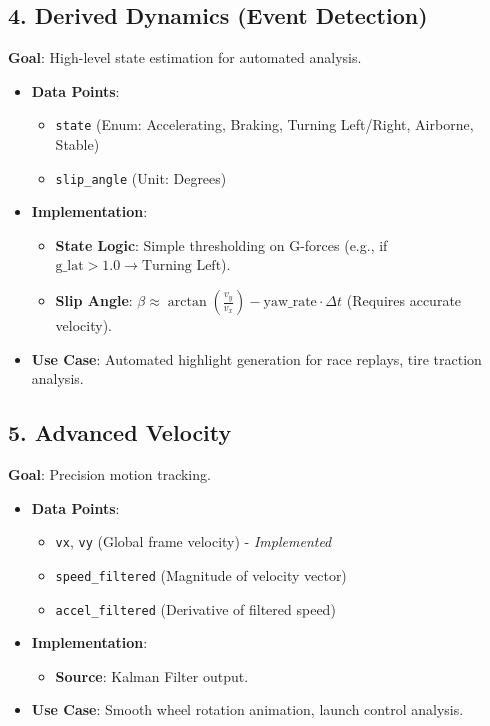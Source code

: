 \documentclass[11pt,a4paper]{article}
\begin{document}
\subsection{4. Derived Dynamics (Event Detection)}
\textbf{Goal}: High-level state estimation for automated analysis.
\begin{itemize}
    \item \textbf{Data Points}:
    \begin{itemize}
        \item \texttt{state} (Enum: Accelerating, Braking, Turning Left/Right, Airborne, Stable)
        \item \texttt{slip\_angle} (Unit: Degrees)
    \end{itemize}
    \item \textbf{Implementation}:
    \begin{itemize}
        \item \textbf{State Logic}: Simple thresholding on G-forces (e.g., if $\text{g\_lat} > 1.0 \to \text{Turning Left}$).
        \item \textbf{Slip Angle}: $\beta \approx \arctan(\frac{v_y}{v_x}) - \text{yaw\_rate} \cdot \Delta t$ (Requires accurate velocity).
    \end{itemize}
    \item \textbf{Use Case}: Automated highlight generation for race replays, tire traction analysis.
\end{itemize}

\subsection{5. Advanced Velocity}
\textbf{Goal}: Precision motion tracking.
\begin{itemize}
    \item \textbf{Data Points}:
    \begin{itemize}
        \item \texttt{vx}, \texttt{vy} (Global frame velocity) - \textit{Implemented}
        \item \texttt{speed\_filtered} (Magnitude of velocity vector)
        \item \texttt{accel\_filtered} (Derivative of filtered speed)
    \end{itemize}
    \item \textbf{Implementation}:
    \begin{itemize}
        \item \textbf{Source}: Kalman Filter output.
    \end{itemize}
    \item \textbf{Use Case}: Smooth wheel rotation animation, launch control analysis.
\end{itemize}
\end{document}
